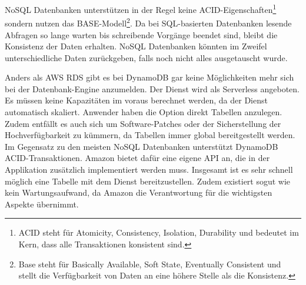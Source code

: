 NoSQL Datenbanken unterstützen in der Regel keine ACID-Eigenschaften\footnote{ACID steht für Atomicity, Consistency, Isolation, Durability und bedeutet im Kern, dass
alle Transaktionen konsistent sind.} sondern nutzen das BASE-Modell\footnote{Base steht für Basically Available, Soft State, Eventually Consistent und
stellt die Verfügbarkeit von Daten an eine höhere Stelle als die Konsistenz.}.
Da bei SQL-basierten Datenbanken lesende Abfragen so lange warten bis schreibende Vorgänge beendet sind, bleibt die Konsistenz der Daten erhalten.
NoSQL Datenbanken könnten im Zweifel unterschiedliche Daten zurückgeben, falls noch nicht alles ausgetauscht wurde. \cite[]{Datenbankvergleich}

Anders als AWS RDS gibt es bei DynamoDB gar keine Möglichkeiten mehr sich bei der Datenbank-Engine anzumelden. Der Dienst wird als Serverless angeboten.
Es müssen keine Kapazitäten im voraus berechnet werden, da der Dienst automatisch skaliert.
Anwender haben die Option direkt Tabellen anzulegen.
Zudem entfällt es auch sich um Software-Patches oder der Sicherstellung der Hochverfügbarkeit zu kümmern, da Tabellen immer global bereitgestellt werden.
Im Gegensatz zu den meisten NoSQL Datenbanken unterstützt DynamoDB ACID-Transaktionen. Amazon bietet dafür eine eigene API an, die in der Applikation zusätzlich
implementiert werden muss. Insgesamt ist es sehr schnell möglich eine Tabelle mit dem Dienst bereitzustellen. Zudem existiert sogut wie kein Wartungsaufwand,
da Amazon die Verantwortung für die wichtigsten Aspekte übernimmt.\cite[]{DynamoDB}

